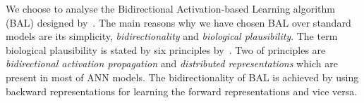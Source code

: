 \label{sec:motivation} 
We choose to analyse the Bidirectional Activation-based Learning algorithm (BAL) designed by~\citet{farkas2013bal}. The main reasons why we have chosen BAL over standard models are its simplicity, \emph{bidirectionality} and \emph{biological plausibility}. The term biological plausibility is stated by six principles by~\citet{hinton1988learning}. Two of principles are \emph{bidirectional activation propagation} and \emph{distributed representations} which are present in most of ANN models. The bidirectionality of BAL is achieved by using backward representations for learning the forward representations and vice versa. 




